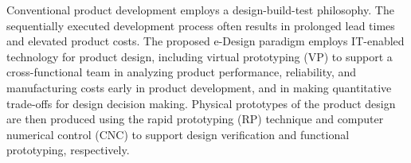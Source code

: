 

\begin{abstract}
  摘要正文选用模板中的样式所定义的“正文”，每段落首行缩进 2 个字符；或者手动设置成每段落首行缩进 2 个汉字，字体：宋体，字号：小四，行距：固定值 22 磅，间距：段前、段后均为 0 行。阅后删除此段。

  摘要是一篇具有独立性和完整性的短文，应概括而扼要地反映出本论文的主要内容。包括研究目的、研究方法、研究结果和结论等，特别要突出研究结果和结论。中文摘要力求语言精炼准确，本科生毕业设计（论文）摘要建议 300-500 字。摘要中不可出现参考文献、图、表、化学结构式、非公知公用的符号和术语。英文摘要与中文摘要的内容应一致。阅后删除此段。
\end{abstract}


\begin{abstractEn}
  Conventional  product  development  employs  a  design-build-test  philosophy.
  The sequentially  executed  development  process  often  results  in  prolonged
  lead  times  and elevated product costs. The proposed e-Design paradigm employs
  IT-enabled technology for product design, including virtual prototyping (VP) to
  support a cross-functional team in analyzing  product  performance,  reliability,
  and  manufacturing costs  early  in  product development, and in making quantitative
  trade-offs for design decision making. Physical prototypes  of  the  product  design
  are  then  produced  using  the  rapid  prototyping  (RP) technique  and  computer
  numerical  control  (CNC)  to  support  design  verification  and functional prototyping, respectively.
\end{abstractEn}
